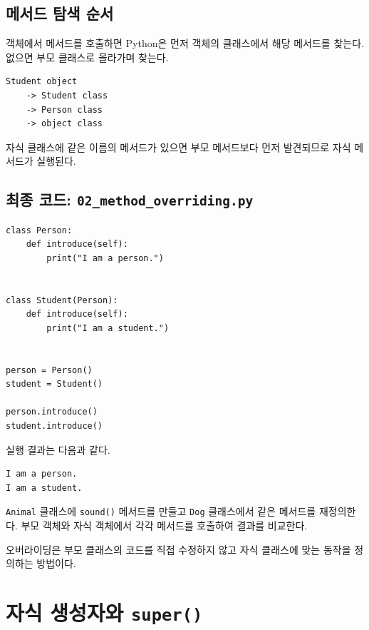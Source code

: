 \documentclass[11pt,a4paper]{article}
\begin{document}
\subsection{메서드 탐색 순서}

객체에서 메서드를 호출하면 Python은 먼저 객체의 클래스에서 해당 메서드를 찾는다. 없으면 부모 클래스로 올라가며 찾는다.

\begin{verbatim}
Student object
    -> Student class
    -> Person class
    -> object class
\end{verbatim}

자식 클래스에 같은 이름의 메서드가 있으면 부모 메서드보다 먼저 발견되므로 자식 메서드가 실행된다.

\subsection{최종 코드: \texttt{02\_method\_overriding.py}}

\begin{lstlisting}
class Person:
    def introduce(self):
        print("I am a person.")


class Student(Person):
    def introduce(self):
        print("I am a student.")


person = Person()
student = Student()

person.introduce()
student.introduce()
\end{lstlisting}

실행 결과는 다음과 같다.

\begin{verbatim}
I am a person.
I am a student.
\end{verbatim}

\begin{practicebox}
\texttt{Animal} 클래스에 \texttt{sound()} 메서드를 만들고 \texttt{Dog} 클래스에서 같은 메서드를 재정의한다. 부모 객체와 자식 객체에서 각각 메서드를 호출하여 결과를 비교한다.
\end{practicebox}

\begin{importantbox}
오버라이딩은 부모 클래스의 코드를 직접 수정하지 않고 자식 클래스에 맞는 동작을 정의하는 방법이다.
\end{importantbox}

\section{자식 생성자와 \texttt{super()}}
\end{document}
